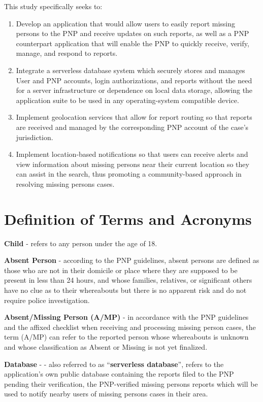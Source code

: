 This study specifically seeks to:

\begin{enumerate}
   \item Develop an application that would allow users to easily report missing persons to the PNP and receive updates on such reports, as well as a PNP counterpart application that will enable the PNP to quickly receive, verify, manage, and respond to reports.
   \item Integrate a serverless database system which securely stores and manages User and PNP accounts, login authorizations, and reports without the need for a server infrastructure or dependence on local data storage, allowing the application suite to be used in any operating-system compatible device.
   \item Implement geolocation services that allow for report routing so that reports are received and managed by the corresponding PNP account of the case’s jurisdiction. 
   \item Implement location-based notifications so that users can receive alerts and view information about missing persons near their current location so they can assist in the search, thus promoting a community-based approach in resolving missing persons cases.
\end{enumerate}

\section{Definition of Terms and Acronyms}

\textbf{Child} - refers to any person under the age of 18.

\textbf{Absent Person} - according to the PNP guidelines, absent persons are defined as those who are not in their domicile or place where they are supposed to be present in less than 24 hours, and whose families, relatives, or significant others have no clue as to their whereabouts but there is no apparent risk and do not require police investigation.

\textbf{Absent/Missing Person (\textbf{A/MP}) }- in accordance with the PNP guidelines and the affixed checklist when receiving and processing missing person cases, the term (A/MP) can refer to the reported person whose whereabouts is unknown and whose classification as Absent or Missing is not yet finalized.

\textbf{Database} - - also referred to as “\textbf{serverless database}”, refers to the application’s own public database containing the reports filed to the PNP pending their verification, the PNP-verified missing persons reports which will be used to notify nearby users of missing persons cases in their area.


